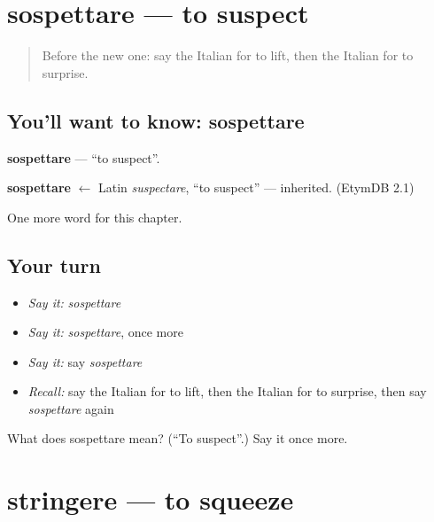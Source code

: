 \section[sospettare]{sospettare — to suspect}

\label{lesson:IT-C184-sospettare}



\begin{quote}
Before the new one: say the Italian for to lift, then the Italian for to surprise.
\end{quote}

\subsection*{You'll want to know: sospettare}
\textbf{sospettare} — \textquotedblleft{}to suspect\textquotedblright{}.

\begin{cousinweb}
\textbf{sospettare} $\leftarrow$ Latin \emph{suspectare}, \textquotedblleft{}to suspect\textquotedblright{} — inherited. (EtymDB 2.1)
\end{cousinweb}

\begin{grammarlens}[title={What you've built}]
One more word for this chapter.
\end{grammarlens}

\subsection*{Your turn}
\begin{itemize}
\raggedright
  \item \emph{Say it:} \emph{sospettare}
  \item \emph{Say it:} \emph{sospettare}, once more
  \item \emph{Say it:} say \emph{sospettare}
  \item \emph{Recall:} say the Italian for to lift, then the Italian for to surprise, then say \emph{sospettare} again
\end{itemize}

\begin{tcolorbox}[breakable,colback=teal!4,colframe=teal!35!black,title={Before you move on}]
What does sospettare mean? (\textquotedblleft{}To suspect\textquotedblright{}.) Say it once more.
\end{tcolorbox}
\section[stringere]{stringere — to squeeze}

